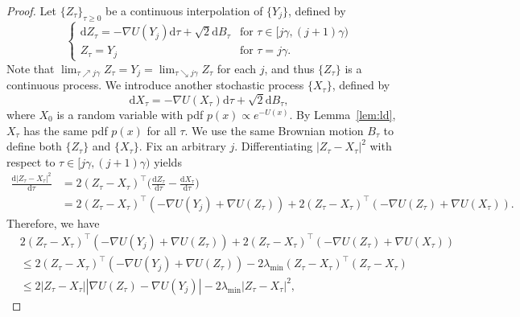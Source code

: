 \documentclass[11pt]{article}
\theoremstyle{plain}
\theoremstyle{definition}
\theoremstyle{remark}
\begin{document}
\begin{proof}
Let $\{Z_{\tau}\}_{\tau \geq 0}$ be a continuous interpolation of $\{Y_j\}$, defined by
\begin{equation}\label{eq:naive_sde_z}
\left \{
\begin{array}{ll}
\mathrm{d} Z_{\tau} = -  \nabla U(Y_j) \mathrm{d}{\tau} + \sqrt{2} \mathrm{d} B_{\tau}& \mbox{for }\tau \in [j\gamma, (j+1) \gamma) \\
Z_{\tau} = Y_j & \mbox{for } \tau = j\gamma.
\end{array}
\right.
\end{equation}
Note that $\lim_{\tau \nearrow j\gamma} Z_{\tau} = Y_j =  \lim_{\tau \searrow j\gamma} Z_{\tau}$ for each $j$, and thus $\{Z_{\tau}\}$ is a continuous process. 
We introduce another stochastic process $\{X_{\tau}\}$, defined by 
\[
\mathrm{d} X_{\tau} = - \nabla U( X_{\tau}) \mathrm{d} \tau + \sqrt{2} \mathrm{d} B_{\tau},
\]
where $X_0$ is a random variable with pdf $p(x) \propto e^{-U(x)}$.
By Lemma~\ref{lem:ld}, $X_{\tau}$ has the same pdf $p(x)$ for all $\tau$. 
We use the same Brownian motion $B_{\tau}$ to define both $\{Z_{\tau}\}$ and $\{X_{\tau}\}$. 
Fix an arbitrary $j$. 
Differentiating $|Z_{\tau} - X_{\tau}|^2$ with respect to $\tau \in [j\gamma, (j+1)\gamma)$ yields
\begin{equation}\nonumber
\begin{split}
\frac{\mathrm{d} |Z_{\tau} - X_{\tau}|^2}{\mathrm{d}{\tau}} &= 2(Z_{\tau} - X_{\tau})^\top \bigg (
\frac{\mathrm{d} Z_{\tau}}{\mathrm{d} {\tau}} - \frac{\mathrm{d} X_{\tau}}{\mathrm{d} {\tau}}
\bigg )\\
&= 2 (Z_{\tau} - X_{\tau})^\top ( - \nabla U (Y_j) +  \nabla U(Z_{\tau}))
+ 2 (Z_{\tau} - X_{\tau})^\top (  - \nabla U(Z_{\tau}) +  \nabla U(X_{\tau})).
\end{split}
\end{equation}
Therefore, we have
\begin{equation}\nonumber
\begin{split}
&2 (Z_{\tau} - X_{\tau})^\top ( - \nabla U (Y_j) + \nabla U(Z_{\tau}))
+ 2 (Z_{\tau} - X_{\tau})^\top (  -  \nabla U(Z_{\tau}) +  \nabla U(X_{\tau}))\\
&\leq 2 (Z_{\tau} - X_{\tau})^\top( - \nabla U (Y_j) +  \nabla U(Z_{\tau}))
- 2\lambda_{\min} (Z_{\tau} - X_{\tau})^\top  (Z_{\tau} - X_{\tau})\\
&\leq  2 |Z_{\tau} - X_{\tau}| |\nabla U(Z_{\tau}) - \nabla U (Y_j) |
-2 \lambda_{\min} |Z_{\tau} - X_{\tau}|^2,
\end{split}

\end{equation}
\end{proof}
\end{document}
